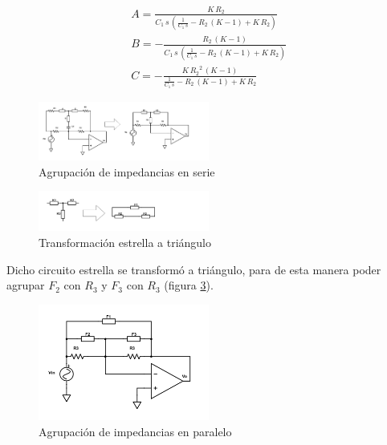 \documentclass[../../tc_tp3_main.tex]{subfiles}
\begin{document}
\begin{gather}
   A=\frac{K\, R_{2}}{C_{1}\, s\, \left(\frac{1}{C_{1}\, s} - R_{2}\, \left(K - 1\right) + K\, R_{2}\right)} \\
B=-\frac{R_{2}\, \left(K - 1\right)}{C_{1}\,s\, \left(\frac{1}{C_{1}\, s} - R_{2}\, \left(K - 1\right) + K\, R_{2}\right)}\\
C=-\frac{K\, {R_{2}}^2\, \left(K - 1\right)}{\frac{1}{C_{1}\, s} - R_{2}\, \left(K - 1\right) + K\, R_{2}}
\end{gather}


\begin{figure}[H]
\centering
\includegraphics[width=0.5\textwidth]{imagenes/simpl2.png}
\caption{Agrupaci\'on de impedancias en serie} \label{fig:cs2}
\end{figure}


\begin{figure}[H]
\centering
\includegraphics[width=0.5\textwidth]{imagenes/simpl3.png}
\caption{Transformación estrella a tri\'angulo} \label{fig:cs3}
\end{figure}

Dicho circuito estrella se transformó a tri\'angulo, para de esta manera poder agrupar $F_2$ con $R_3$ y $F_3$ con $R_3$ (figura \ref{fig:cs4}).




\begin{figure}[H]
\centering
\includegraphics[width=0.5\textwidth]{imagenes/simpl4.png}
\caption{Agrupaci\'on de impedancias en paralelo} \label{fig:cs4}
\end{figure}
\end{document}
